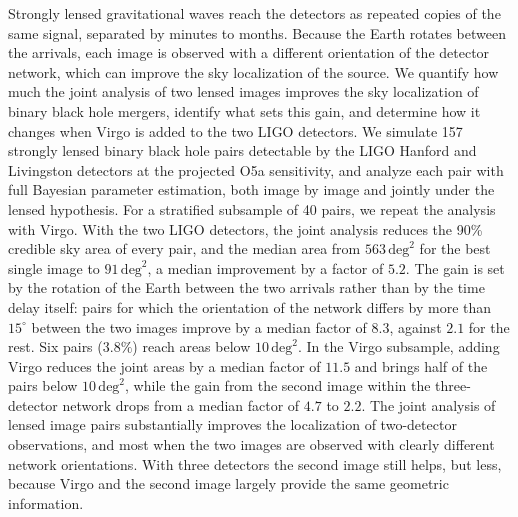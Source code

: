 \documentclass{aa}
\begin{document}
  \abstract
   {Strongly lensed gravitational waves reach the detectors as repeated
   copies of the same signal, separated by minutes to months. Because the
   Earth rotates between the arrivals, each image is observed with a
   different orientation of the detector network, which can improve the
   sky localization of the source.}
   {We quantify how much the joint analysis of two lensed images improves
   the sky localization of binary black hole mergers, identify what sets
   this gain, and determine how it changes when Virgo is added to the two
   LIGO detectors.}
   {We simulate 157 strongly lensed binary black hole pairs detectable by
   the LIGO Hanford and Livingston detectors at the projected O5a
   sensitivity, and analyze each pair with full Bayesian parameter
   estimation, both image by image and jointly under the lensed
   hypothesis. For a stratified subsample of 40 pairs, we repeat the
   analysis with Virgo.}
   {With the two LIGO detectors, the joint analysis reduces the 90\%
   credible sky area of every pair, and the median area from
   $563\,\mathrm{deg}^2$ for the best single image to $91\,\mathrm{deg}^2$,
   a median improvement by a factor of $5.2$. The gain is set by the
   rotation of the Earth between the two arrivals rather than by the time
   delay itself: pairs for which the orientation of the network differs by
   more than $15^\circ$ between the two images improve by a median factor
   of $8.3$, against $2.1$ for the rest. Six pairs ($3.8\%$) reach areas
   below $10\,\mathrm{deg}^2$. In the Virgo subsample, adding Virgo reduces
   the joint areas by a median factor of $11.5$ and brings half of the
   pairs below $10\,\mathrm{deg}^2$, while the gain from the second image
   within the three-detector network drops from a median factor of $4.7$
   to $2.2$.}
   {The joint analysis of lensed image pairs substantially improves the
   localization of two-detector observations, and most when the two images
   are observed with clearly different network orientations. With three
   detectors the second image still helps, but less, because Virgo and the
   second image largely provide the same geometric information.}


   \maketitle
\end{document}
